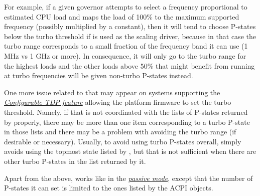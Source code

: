 \documentclass[a4paper,8pt,english]{sphinxmanual}
\begin{document}
For example, if a given governor attempts to select a frequency proportional to
estimated CPU load and maps the load of 100\% to the maximum supported frequency
(possibly multiplied by a constant), then it will tend to choose P-states below
the turbo threshold if  is used as the scaling driver, because
in that case the turbo range corresponds to a small fraction of the frequency
band it can use (1 MHz vs 1 GHz or more).  In consequence, it will only go to
the turbo range for the highest loads and the other loads above 50\% that might
benefit from running at turbo frequencies will be given non-turbo P-states
instead.

One more issue related to that may appear on systems supporting the
{\hyperref[admin\string-guide/pm/intel_pstate:turbo]{\emph{Configurable TDP feature}}}\label{admin-guide/pm/intel_pstate:turbo} allowing the platform firmware to set the
turbo threshold.  Namely, if that is not coordinated with the lists of P-states
returned by  properly, there may be more than one item corresponding to
a turbo P-state in those lists and there may be a problem with avoiding the
turbo range (if desirable or necessary).  Usually, to avoid using turbo
P-states overall,  simply avoids using the topmost state listed
by , but that is not sufficient when there are other turbo P-states in
the list returned by it.

Apart from the above,  works like  in the
{\hyperref[admin\string-guide/pm/intel_pstate:passive\string-mode]{\emph{passive mode}}}\label{admin-guide/pm/intel_pstate:passive-mode}, except that the number of P-states it can set
is limited to the ones listed by the ACPI  objects.
\end{document}

